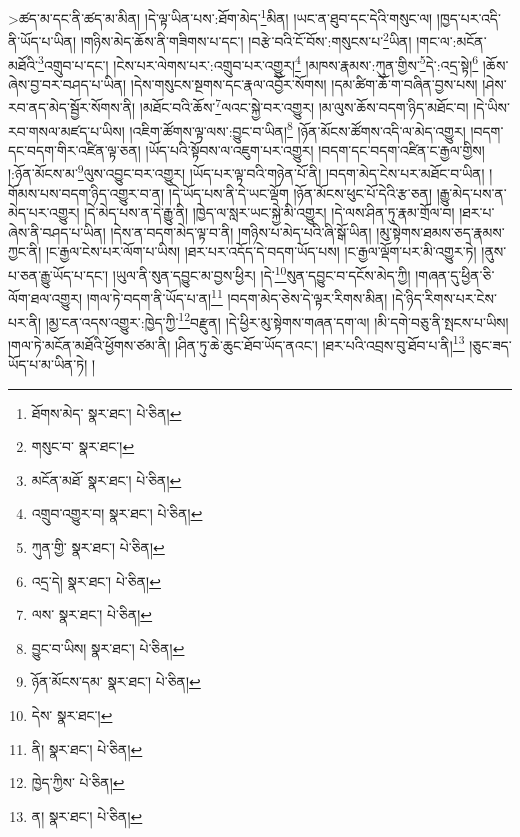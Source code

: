 >ཚད་མ་དང་ནི་ཚད་མ་མིན། །དེ་ལྟ་ཡིན་པས་:ཐོག་མེད་\footnote{ཐོགས་མེད་  སྣར་ཐང་།  པེ་ཅིན། }མིན། །ཡང་ན་ཐུབ་དང་དེའི་གསུང་ལ། །ཁྱད་པར་འདི་ནི་ཡོད་པ་ཡིན། །གཉིས་མེད་ཆོས་ནི་གཟིགས་པ་དང་། །བརྩེ་བའི་ངོ་བོས་:གསུངས་པ་\footnote{གསུང་བ་  སྣར་ཐང་། }ཡིན། །གང་ལ་:མངོན་མཐོའི་\footnote{མངོན་མཐོ་  སྣར་ཐང་།  པེ་ཅིན། }འགྲུབ་པ་དང་། །ངེས་པར་ལེགས་པར་:འགྲུབ་པར་འགྱུར།\footnote{འགྲུབ་འགྱུར་བ།  སྣར་ཐང་།  པེ་ཅིན། } །མཁས་རྣམས་:ཀུན་གྱིས་\footnote{ཀུན་གྱི་  སྣར་ཐང་།  པེ་ཅིན། }དེ་:འདྲ་སྟེ།\footnote{འདྲ་དེ།  སྣར་ཐང་།  པེ་ཅིན། } །ཆོས་ཞེས་བྱ་བར་བཤད་པ་ཡིན། །དེས་གསུངས་སྔགས་དང་རྣལ་འབྱོར་སོགས། །དམ་ཚིག་ཆོ་ག་བཞིན་བྱས་པས། །ཤེས་རབ་ནད་མེད་སྦྱོར་སོགས་ནི། །མཐོང་བའི་ཆོས་\footnote{ལས་  སྣར་ཐང་།  པེ་ཅིན། }ལའང་སྐྱེ་བར་འགྱུར། །མ་ལུས་ཆོས་བདག་ཉིད་མཐོང་བ། །དེ་ཡིས་རབ་གསལ་མཛད་པ་ཡིས། །འཇིག་ཚོགས་ལྟ་ལས་:བྱུང་བ་ཡིན།\footnote{བྱུང་བ་ཡིས།  སྣར་ཐང་།  པེ་ཅིན། } །ཉོན་མོངས་ཚོགས་འདི་ལ་མེད་འགྱུར། །བདག་དང་བདག་གིར་འཛིན་ལྟ་ཅན། །ཡོད་པའི་སྟོབས་ལ་འཇུག་པར་འགྱུར། །བདག་དང་བདག་འཛིན་ང་རྒྱལ་གྱིས། །:ཉོན་མོངས་མ་\footnote{ཉོན་མོངས་དམ་  སྣར་ཐང་།  པེ་ཅིན། }ལུས་འབྱུང་བར་འགྱུར། །ཡོད་པར་ལྟ་བའི་གཉེན་པོ་ནི། །བདག་མེད་ངེས་པར་མཐོང་བ་ཡིན། །གོམས་པས་བདག་ཉིད་འགྱུར་བ་ན། །དེ་ཡོད་པས་ནི་དེ་ཡང་ལྡོག །ཉོན་མོངས་ཕུང་པོ་དེའི་རྩ་ཅན། །རྒྱུ་མེད་པས་ན་མེད་པར་འགྱུར། །དེ་མེད་པས་ན་དེ་རྒྱུ་ནི། །ཁྱེད་ལ་སླར་ཡང་སྐྱེ་མི་འགྱུར། །དེ་ལས་ཤིན་ཏུ་རྣམ་གྲོལ་བ། །ཐར་པ་ཞེས་ནི་བཤད་པ་ཡིན། །དེས་ན་བདག་མེད་ལྟ་བ་ནི། །གཉིས་པ་མེད་པའི་ཞི་སྒོ་ཡིན། །མུ་སྟེགས་ཐམས་ཅད་རྣམས་ཀྱང་ནི། །ང་རྒྱལ་ངེས་པར་ལོག་པ་ཡིས། །ཐར་པར་འདོད་དེ་བདག་ཡོད་པས། །ང་རྒྱལ་ལྡོག་པར་མི་འགྱུར་ཏེ། །ནུས་པ་ཅན་རྒྱུ་ཡོད་པ་དང་། །ཡུལ་ནི་སུན་དབྱུང་མ་བྱས་ཕྱིར། །དེ་\footnote{དེས་  སྣར་ཐང་། }སུན་དབྱུང་བ་དངོས་མེད་ཀྱི། །གཞན་དུ་ཕྱིན་ཅི་ལོག་ཐལ་འགྱུར། །གལ་ཏེ་བདག་ནི་ཡོད་པ་ན།\footnote{ནི།  སྣར་ཐང་།  པེ་ཅིན། } །བདག་མེད་ཅེས་དེ་ལྟར་རིགས་མིན། །དེ་ཉིད་རིགས་པར་ངེས་པར་ནི། །མྱ་ངན་འདས་འགྱུར་:ཁྱེད་ཀྱི་\footnote{ཁྱེད་ཀྱིས་  པེ་ཅིན། }བརྫུན། །དེ་ཕྱིར་མུ་སྟེགས་གཞན་དག་ལ། །མི་དགེ་བཅུ་ནི་སྤངས་པ་ཡིས། །གལ་ཏེ་མངོན་མཐོའི་ཕྱོགས་ཙམ་ནི། །ཤིན་ཏུ་ཆེ་ཆུང་ཐོབ་ཡོད་ནའང་། །ཐར་པའི་འབྲས་བུ་ཐོབ་པ་ནི།\footnote{ན།  སྣར་ཐང་།  པེ་ཅིན། } །ཅུང་ཟད་ཡོད་པ་མ་ཡིན་ཏེ། །
